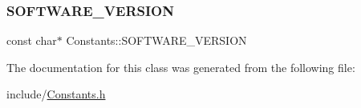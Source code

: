\subsubsection{\texorpdfstring{S\+O\+F\+T\+W\+A\+R\+E\+\_\+\+V\+E\+R\+S\+I\+ON}{SOFTWARE\_VERSION}}
{\footnotesize\ttfamily const char$\ast$ Constants\+::\+S\+O\+F\+T\+W\+A\+R\+E\+\_\+\+V\+E\+R\+S\+I\+ON\hspace{0.3cm}{\ttfamily [static]}}



The documentation for this class was generated from the following file\+:\begin{DoxyCompactItemize}
\item 
include/\hyperlink{_constants_8h}{Constants.\+h}\end{DoxyCompactItemize}
